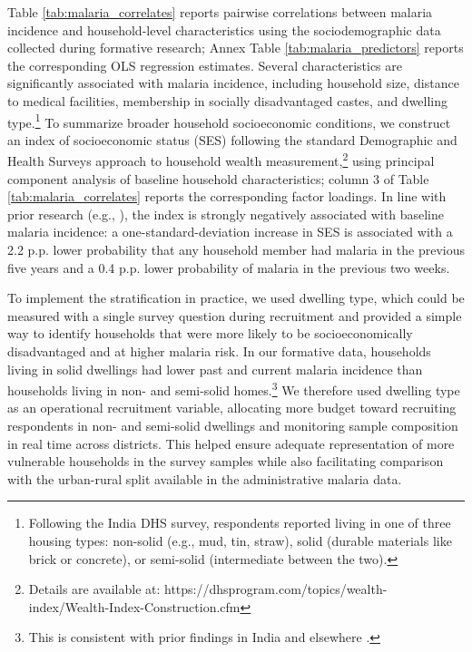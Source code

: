 Table \ref{tab:malaria_correlates} reports pairwise correlations between malaria incidence and household-level characteristics using the sociodemographic data collected during formative research; Annex Table \ref{tab:malaria_predictors} reports the corresponding OLS regression estimates. Several characteristics are significantly associated with malaria incidence, including household size, distance to medical facilities, membership in socially disadvantaged castes, and dwelling type.\footnote{Following the India DHS survey, respondents reported living in one of three housing types: non-solid (e.g., mud, tin, straw), solid (durable materials like brick or concrete), or semi-solid (intermediate between the two).} To summarize broader household socioeconomic conditions, we construct an index of socioeconomic status (SES) following the standard Demographic and Health Surveys approach to household wealth measurement,\footnote{Details are available at: https://dhsprogram.com/topics/wealth-index/Wealth-Index-Construction.cfm} using principal component analysis of baseline household characteristics; column 3 of Table \ref{tab:malaria_correlates} reports the corresponding factor loadings. In line with prior research (e.g., \citealt{dev2004physiographic}), the index is strongly negatively associated with baseline malaria incidence: a one-standard-deviation increase in SES is associated with a 2.2 p.p. lower probability that any household member had malaria in the previous five years and a 0.4 p.p. lower probability of malaria in the previous two weeks.

\begin{table}[!htbp]
    \centering
    \caption{Pairwise correlations between malaria incidence, household characteristics, and SES index}
    \footnotesize
    
    \label{tab:malaria_correlates}
\end{table}

To implement the stratification in practice, we used dwelling type, which could be measured with a single survey question during recruitment and provided a simple way to identify households that were more likely to be socioeconomically disadvantaged and at higher malaria risk. In our formative data, households living in solid dwellings had lower past and current malaria incidence than households living in non- and semi-solid homes.\footnote{This is consistent with prior findings in India \citep{yadav2014socio} and elsewhere \citep{wanzirah2015mind}.} We therefore used dwelling type as an operational recruitment variable, allocating more budget toward recruiting respondents in non- and semi-solid dwellings and monitoring sample composition in real time across districts. This helped ensure adequate representation of more vulnerable households in the survey samples while also facilitating comparison with the urban-rural split available in the administrative malaria data.



